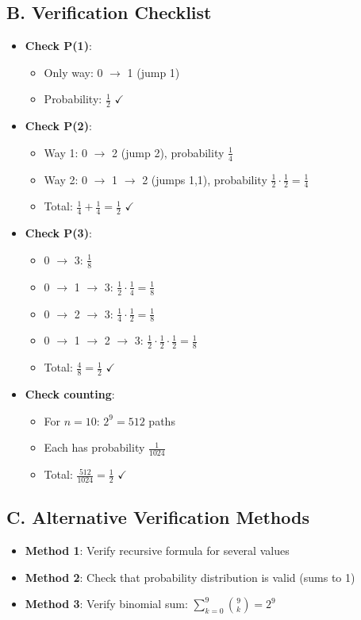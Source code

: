 \documentclass[11pt]{article}
\begin{document}
\begin{verificationbox}
\subsection*{B. Verification Checklist}
\begin{itemize}[leftmargin=*]
    \item \textbf{Check P(1)}:
    \begin{itemize}
        \item Only way: 0 $\to$ 1 (jump 1)
        \item Probability: $\frac{1}{2}$ $\checkmark$
    \end{itemize}
    \item \textbf{Check P(2)}:
    \begin{itemize}
        \item Way 1: 0 $\to$ 2 (jump 2), probability $\frac{1}{4}$
        \item Way 2: 0 $\to$ 1 $\to$ 2 (jumps 1,1), probability $\frac{1}{2} \cdot \frac{1}{2} = \frac{1}{4}$
        \item Total: $\frac{1}{4} + \frac{1}{4} = \frac{1}{2}$ $\checkmark$
    \end{itemize}
    \item \textbf{Check P(3)}:
    \begin{itemize}
        \item 0 $\to$ 3: $\frac{1}{8}$
        \item 0 $\to$ 1 $\to$ 3: $\frac{1}{2} \cdot \frac{1}{4} = \frac{1}{8}$
        \item 0 $\to$ 2 $\to$ 3: $\frac{1}{4} \cdot \frac{1}{2} = \frac{1}{8}$
        \item 0 $\to$ 1 $\to$ 2 $\to$ 3: $\frac{1}{2} \cdot \frac{1}{2} \cdot \frac{1}{2} = \frac{1}{8}$
        \item Total: $\frac{4}{8} = \frac{1}{2}$ $\checkmark$
    \end{itemize}
    \item \textbf{Check counting}:
    \begin{itemize}
        \item For $n=10$: $2^9 = 512$ paths
        \item Each has probability $\frac{1}{1024}$
        \item Total: $\frac{512}{1024} = \frac{1}{2}$ $\checkmark$
    \end{itemize}
\end{itemize}

\subsection*{C. Alternative Verification Methods}
\begin{itemize}[leftmargin=*]
    \item \textbf{Method 1}: Verify recursive formula for several values
    \item \textbf{Method 2}: Check that probability distribution is valid (sums to 1)
    \item \textbf{Method 3}: Verify binomial sum: $\sum_{k=0}^{9} \binom{9}{k} = 2^9$
\end{itemize}


\end{verificationbox}
\end{document}
